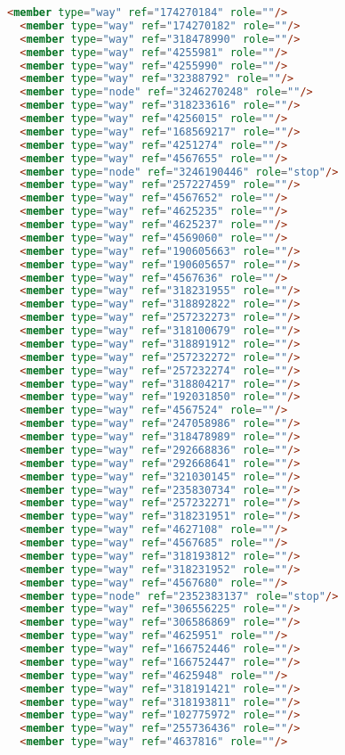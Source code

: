 \begin{lstlisting}[language=HTML,basicstyle=\tiny,caption=test.xml]
  <member type="way" ref="174270184" role=""/>
  <member type="way" ref="174270182" role=""/>
  <member type="way" ref="318478990" role=""/>
  <member type="way" ref="4255981" role=""/>
  <member type="way" ref="4255990" role=""/>
  <member type="way" ref="32388792" role=""/>
  <member type="node" ref="3246270248" role=""/>
  <member type="way" ref="318233616" role=""/>
  <member type="way" ref="4256015" role=""/>
  <member type="way" ref="168569217" role=""/>
  <member type="way" ref="4251274" role=""/>
  <member type="way" ref="4567655" role=""/>
  <member type="node" ref="3246190446" role="stop"/>
  <member type="way" ref="257227459" role=""/>
  <member type="way" ref="4567652" role=""/>
  <member type="way" ref="4625235" role=""/>
  <member type="way" ref="4625237" role=""/>
  <member type="way" ref="4569060" role=""/>
  <member type="way" ref="190605663" role=""/>
  <member type="way" ref="190605657" role=""/>
  <member type="way" ref="4567636" role=""/>
  <member type="way" ref="318231955" role=""/>
  <member type="way" ref="318892822" role=""/>
  <member type="way" ref="257232273" role=""/>
  <member type="way" ref="318100679" role=""/>
  <member type="way" ref="318891912" role=""/>
  <member type="way" ref="257232272" role=""/>
  <member type="way" ref="257232274" role=""/>
  <member type="way" ref="318804217" role=""/>
  <member type="way" ref="192031850" role=""/>
  <member type="way" ref="4567524" role=""/>
  <member type="way" ref="247058986" role=""/>
  <member type="way" ref="318478989" role=""/>
  <member type="way" ref="292668836" role=""/>
  <member type="way" ref="292668641" role=""/>
  <member type="way" ref="321030145" role=""/>
  <member type="way" ref="235830734" role=""/>
  <member type="way" ref="257232271" role=""/>
  <member type="way" ref="318231951" role=""/>
  <member type="way" ref="4627108" role=""/>
  <member type="way" ref="4567685" role=""/>
  <member type="way" ref="318193812" role=""/>
  <member type="way" ref="318231952" role=""/>
  <member type="way" ref="4567680" role=""/>
  <member type="node" ref="2352383137" role="stop"/>
  <member type="way" ref="306556225" role=""/>
  <member type="way" ref="306586869" role=""/>
  <member type="way" ref="4625951" role=""/>
  <member type="way" ref="166752446" role=""/>
  <member type="way" ref="166752447" role=""/>
  <member type="way" ref="4625948" role=""/>
  <member type="way" ref="318191421" role=""/>
  <member type="way" ref="318193811" role=""/>
  <member type="way" ref="102775972" role=""/>
  <member type="way" ref="255736436" role=""/>
  <member type="way" ref="4637816" role=""/>

\end{lstlisting}
